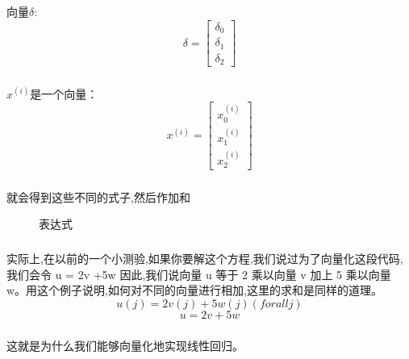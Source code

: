\documentclass{article}
\begin{document}
\begin{CJK}{UTF8}{gbsn}
\subparagraph{}
向量$\delta$:
\begin{equation}
\delta=\left[\begin{matrix}
\delta_0\\\delta_1\\\delta_2
\end{matrix}\right]
\end{equation}
\subparagraph{}
$x^{(i)}$是一个向量：
\begin{equation}
x^{(i)}=\left[\begin{matrix}
x^{(i)}_0\\x^{(i)}_1\\x^{(i)}_2
\end{matrix}\right]
\end{equation}
\subparagraph{}
就会得到这些不同的式子,然后作加和
\begin{figure}[H]
\caption{表达式}
\label{fig:131}
\end{figure}
\subparagraph{}
实际上,在以前的一个小测验,如果你要解这个方程,我们说过为了向量化这段代码,
我们会令 u = 2v +5w 因此,我们说向量 u 等于 2 乘以向量 v 加上 5 乘以向量 w。用这个例子说明,如何对不同的向量进行相加,这里的求和是同样的道理。
\begin{equation}
u(j)=2v(j)+5w(j)(for all j)
\end{equation}
\begin{equation}
u=2v+5w
\end{equation}
\subparagraph{}
这就是为什么我们能够向量化地实现线性回归。
\end{CJK}
\end{document}

